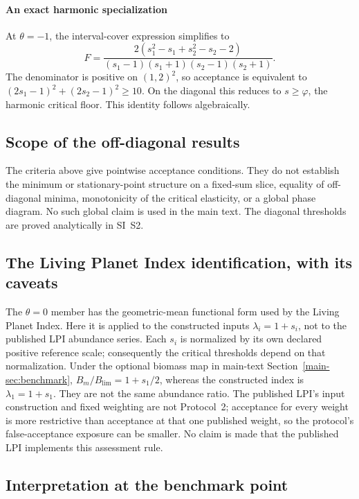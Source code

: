 \paragraph{An exact harmonic specialization} At $\theta=-1$, the interval-cover expression simplifies to
\[
F=\frac{2(s_1^2-s_1+s_2^2-s_2-2)}{(s_1-1)(s_1+1)(s_2-1)(s_2+1)}.
\]
The denominator is positive on $(1,2)^2$, so acceptance is equivalent to $(2s_1-1)^2+(2s_2-1)^2\ge10$. On the diagonal this reduces to $s\ge\varphi$, the harmonic critical floor. This identity follows algebraically.

\subsection{Scope of the off-diagonal results}

The criteria above give pointwise acceptance conditions. They do not establish the minimum or stationary-point structure on a fixed-sum slice, equality of off-diagonal minima, monotonicity of the critical elasticity, or a global phase diagram. No such global claim is used in the main text. The diagonal thresholds are proved analytically in SI~S2.

\subsection{The Living Planet Index identification, with its caveats}

The $\theta=0$ member has the geometric-mean functional form used by the Living Planet Index. Here it is applied to the constructed inputs $\lambda_i=1+s_i$, not to the published LPI abundance series. Each $s_i$ is normalized by its own declared positive reference scale; consequently the critical thresholds depend on that normalization. Under the optional biomass map in main-text Section~\ref{main-sec:benchmark}, $B_m/B_{\mathrm{lim}}=1+s_1/2$, whereas the constructed index is $\lambda_1=1+s_1$. They are not the same abundance ratio. The published LPI's input construction and fixed weighting are not Protocol~2; acceptance for every weight is more restrictive than acceptance at that one published weight, so the protocol's false-acceptance exposure can be smaller. No claim is made that the published LPI implements this assessment rule.

\subsection{Interpretation at the benchmark point}

